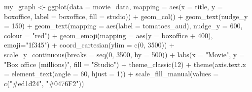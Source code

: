 \documentclass[
]{krantz}
\makeatletter
\newenvironment{Shaded}{\begin{snugshade}}{\end{snugshade}}
\newcommand{\AttributeTok}[1]{\textcolor[rgb]{0.61,0.61,0.61}{#1}}
\newcommand{\DecValTok}[1]{\textcolor[rgb]{0.06,0.06,0.06}{#1}}
\newcommand{\FunctionTok}[1]{\textcolor[rgb]{0,0,0}{#1}}
\newcommand{\NormalTok}[1]{#1}
\newcommand{\OtherTok}[1]{\textcolor[rgb]{0.37,0.37,0.37}{#1}}
\newcommand{\SpecialCharTok}[1]{\textcolor[rgb]{0,0,0}{#1}}
\newcommand{\StringTok}[1]{\textcolor[rgb]{0.5,0.5,0.5}{#1}}
\newenvironment{kframe}{%
\medskip{}
\setlength{\fboxsep}{.8em}
 \def\at@end@of@kframe{}%
 \ifinner\ifhmode%
  \def\at@end@of@kframe{\end{minipage}}%
  \begin{minipage}{\columnwidth}%
 \fi\fi%
 \def\FrameCommand##1{\hskip\@totalleftmargin \hskip-\fboxsep
 \colorbox{shadecolor}{##1}\hskip-\fboxsep
     \hskip-\linewidth \hskip-\@totalleftmargin \hskip\columnwidth}%
 \MakeFramed {\advance\hsize-\width
   \@totalleftmargin\z@ \linewidth\hsize
   \@setminipage}}%
 {\par\unskip\endMakeFramed%
 \at@end@of@kframe}
\renewenvironment{Shaded}{\begin{kframe}}{\end{kframe}}
\makeatother
\begin{document}
\begin{Shaded}
\begin{Highlighting}[]
\NormalTok{my\_graph }\OtherTok{\textless{}{-}} \FunctionTok{ggplot}\NormalTok{(}\AttributeTok{data =}\NormalTok{ movie\_data,}
           \AttributeTok{mapping =} \FunctionTok{aes}\NormalTok{(}\AttributeTok{x =}\NormalTok{ title,}
                         \AttributeTok{y =}\NormalTok{ boxoffice,}
                         \AttributeTok{label =}\NormalTok{ boxoffice, }
                         \AttributeTok{fill =}\NormalTok{ studio)) }\SpecialCharTok{+}
  \FunctionTok{geom\_col}\NormalTok{() }\SpecialCharTok{+}
  \FunctionTok{geom\_text}\NormalTok{(}\AttributeTok{nudge\_y =} \DecValTok{150}\NormalTok{)  }\SpecialCharTok{+}
  \FunctionTok{geom\_text}\NormalTok{(}\AttributeTok{mapping =} \FunctionTok{aes}\NormalTok{(}\AttributeTok{label =}\NormalTok{ tomatoes\_aud), }
            \AttributeTok{nudge\_y =} \DecValTok{600}\NormalTok{, }
            \AttributeTok{colour =} \StringTok{"red"}\NormalTok{) }\SpecialCharTok{+}
  \FunctionTok{geom\_emoji}\NormalTok{(}\AttributeTok{mapping =} \FunctionTok{aes}\NormalTok{(}\AttributeTok{y =}\NormalTok{ boxoffice }\SpecialCharTok{+} \DecValTok{400}\NormalTok{),}
             \AttributeTok{emoji=}\StringTok{"1f345"}\NormalTok{) }\SpecialCharTok{+}
  \FunctionTok{coord\_cartesian}\NormalTok{(}\AttributeTok{ylim =} \FunctionTok{c}\NormalTok{(}\DecValTok{0}\NormalTok{, }\DecValTok{3500}\NormalTok{)) }\SpecialCharTok{+}
  \FunctionTok{scale\_y\_continuous}\NormalTok{(}\AttributeTok{breaks =} \FunctionTok{seq}\NormalTok{(}\DecValTok{0}\NormalTok{, }\DecValTok{3500}\NormalTok{, }\AttributeTok{by =} \DecValTok{500}\NormalTok{)) }\SpecialCharTok{+}
  \FunctionTok{labs}\NormalTok{(}\AttributeTok{x =} \StringTok{"Movie"}\NormalTok{,}
       \AttributeTok{y =} \StringTok{"Box office (millions)"}\NormalTok{,}
       \AttributeTok{fill =} \StringTok{"Studio"}\NormalTok{) }\SpecialCharTok{+}
  \FunctionTok{theme\_classic}\NormalTok{(}\DecValTok{12}\NormalTok{) }\SpecialCharTok{+}
  \FunctionTok{theme}\NormalTok{(}\AttributeTok{axis.text.x =} \FunctionTok{element\_text}\NormalTok{(}\AttributeTok{angle =} \DecValTok{60}\NormalTok{, }
                                   \AttributeTok{hjust =} \DecValTok{1}\NormalTok{)) }\SpecialCharTok{+}
  \FunctionTok{scale\_fill\_manual}\NormalTok{(}\AttributeTok{values =} \FunctionTok{c}\NormalTok{(}\StringTok{"\#ed1d24"}\NormalTok{, }\StringTok{"\#0476F2"}\NormalTok{))}
\end{Highlighting}
\end{Shaded}
\end{document}
